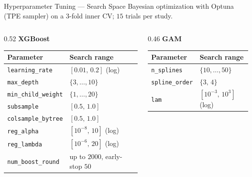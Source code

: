 \begin{frame}[noframenumbering]{Hyperparameter Tuning — Search Space}
  \footnotesize
  Bayesian optimization with Optuna (TPE sampler) on a $3$-fold inner CV;
  $15$ trials per study.
  \vspace{0.3em}
  \begin{columns}[T]
    \begin{column}{0.52\textwidth}
      \textbf{XGBoost} \\
      \scriptsize
      \renewcommand{\arraystretch}{1.1}
      \begin{center}
      \begin{tabular}{@{}ll@{}}
        \toprule
        Parameter & Search range \\
        \midrule
        \texttt{learning\_rate}    & $[0.01,\,0.2]$ (log) \\
        \texttt{max\_depth}        & $\{3,\dots,10\}$ \\
        \texttt{min\_child\_weight}& $\{1,\dots,20\}$ \\
        \texttt{subsample}         & $[0.5,\,1.0]$ \\
        \texttt{colsample\_bytree} & $[0.5,\,1.0]$ \\
        \texttt{reg\_alpha}        & $[10^{-8},\,10]$ (log) \\
        \texttt{reg\_lambda}       & $[10^{-6},\,20]$ (log) \\
        \texttt{num\_boost\_round} & up to $2000$, early-stop $50$ \\
        \bottomrule
      \end{tabular}
      \end{center}
    \end{column}
    \begin{column}{0.46\textwidth}
      \textbf{GAM} \\
      \scriptsize
      \renewcommand{\arraystretch}{1.1}
      \begin{center}
      \begin{tabular}{@{}ll@{}}
        \toprule
        Parameter & Search range \\
        \midrule
        \texttt{n\_splines}    & $\{10,\dots,50\}$ \\
        \texttt{spline\_order} & $\{3,\,4\}$ \\
        \texttt{lam}           & $[10^{-3},\,10^{3}]$ (log) \\
        \bottomrule
      \end{tabular}
      \end{center}
      \vspace{0.5em}


\end{column}
\end{columns}
\end{frame}
